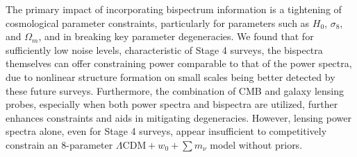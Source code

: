 \documentclass[11pt]{article} %
\begin{document}
The primary impact of incorporating bispectrum information is a tightening of cosmological parameter constraints, particularly for parameters such as $H_0$, $\sigma_8$, and $\Omega_m$, and in breaking key parameter degeneracies. We found that for sufficiently low noise levels, characteristic of Stage 4 surveys, the bispectra themselves can offer constraining power comparable to that of the power spectra, due to nonlinear structure formation on small scales being better detected by these future surveys. Furthermore, the combination of CMB and galaxy lensing probes, especially when both power spectra and bispectra are utilized, further enhances constraints and aids in mitigating degeneracies. However, lensing power spectra alone, even for Stage 4 surveys, appear insufficient to competitively constrain an 8-parameter $\Lambda\text{CDM} + w_0 + \sum m_\nu$ model without priors.
\end{document}
